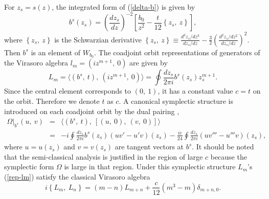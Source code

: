 \documentclass[a4paper,11pt]{article}
\begin{document}
For $z_s=s(z)$, the integrated form of (\ref{delta-b}) is given by 
\begin{equation}
\label{b^s}
b^s(z_s)=\left(\frac{dz_s}{dz}\right)^{-2}
  \left[\frac{b_0}{z^2}-\frac{t}{12}\left\{z_s, \ z\right\}\right],
\end{equation}
where $\left\{z_s, \ z\right\}$ is the Schwarzian derivative 
$\left\{z_s, \ z\right\}\equiv\frac{d^3z_s/dz^3}{dz_s/dz}
 -\frac{3}{2}\left(\frac{d^2z_s/dz^2}{dz_s/dz}\right)^2$.
Then $b^s$ is an element of $W_{b_0}$.
The coadjoint orbit representations of generators of the Virasoro algebra
$l_m=\left(iz^{m+1}, \ 0\right)$ are given by 
\begin{equation}
\label{rep-lm}
L_m = \langle (b^s, \ t), \ (iz^{m+1}, \ 0) \rangle 
 = \oint\frac{dz_s}{2\pi i} b^s(z_s)z_s^{m+1}.
\end{equation}
Since the central element corresponds to $(0, \ 1)$, 
it has a constant value $c=t$ on the orbit.
Therefore we denote $t$ as $c$.
A canonical symplectic structure is introduced on each coadjoint orbit
by the dual pairing \cite{Witten3, Woodhouse},
\begin{eqnarray}
\Omega|_{b^s}(u, \ v) 
   &=& \langle (b^s, \ t), \ [(u, \ 0), \ (v, \ 0)] \rangle \nonumber \\
   &=& -i\oint\frac{dz_s}{2\pi i}b^s(z_s)\left(uv'-u'v\right)(z_s)
        -\frac{ic}{24}\oint\frac{dz_s}{2\pi i}\left(uv'''-u'''v\right)(z_s),
\end{eqnarray}
where $u=u(z_s)$ and $v=v(z_s)$ are tangent vectors at $b^s$.
It should be noted that the semi-classical analysis is justified 
in the region of large $c$ because the symplectic form $\Omega$ is large
in that region. 
Under this symplectic structure $L_m$'s (\ref{rep-lm}) satisfy 
the classical Virasoro algebra
\begin{equation}
\label{cl-Virasoro}
i\left\{L_m, \ L_n\right\}
   =(m-n)L_{m+n}+\frac{c}{12}(m^3-m)\delta_{m+n,0}.
\end{equation}
\end{document}
